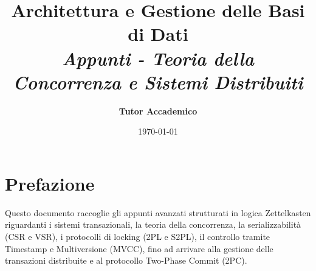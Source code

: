 \documentclass[a4paper,12pt]{book}
\title{
    \vspace{2cm}
    \Huge \textbf{Architettura e Gestione delle Basi di Dati} \\
    \vspace{0.5cm}
    \Large \textit{Appunti - Teoria della Concorrenza e Sistemi Distribuiti}
    \vspace{2cm}
}
\author{\textbf{Tutor Accademico}}
\date{\today}
\theoremstyle{definition}
\begin{document}
\frontmatter
\maketitle

\chapter*{Prefazione}
Questo documento raccoglie gli appunti avanzati strutturati in logica Zettelkasten riguardanti i sistemi transazionali, la teoria della concorrenza, la serializzabilità (CSR e VSR), i protocolli di locking (2PL e S2PL), il controllo tramite Timestamp e Multiversione (MVCC), fino ad arrivare alla gestione delle transazioni distribuite e al protocollo Two-Phase Commit (2PC).

\tableofcontents

\mainmatter










\end{document}
